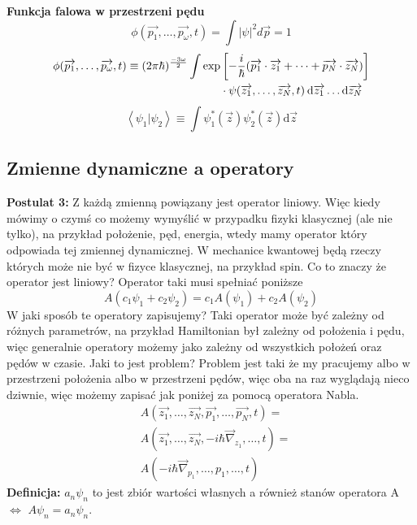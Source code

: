 \textbf{Funkcja falowa w przestrzeni pędu}
\begin{equation*}
	\phi (\overrightarrow{p_1}, \dots, \overrightarrow{p_{\omega}}, t) = \int |\psi|^2 d \overrightarrow{p} = 1
\end{equation*}
\begin{equation*}
	\begin{split}
		\phi (\overrightarrow{p_1}, \dots, \overrightarrow{p_{\omega}}, t) \equiv (2 \pi \hbar)^{\frac{-3\omega}{2}} \int \text{exp}&\left[ -\frac{i}{\hbar} (\overrightarrow{p_1} \cdot \overrightarrow{z_1} + \dots + \overrightarrow{p_N} \cdot \overrightarrow{z_N})  \right] \\
		&\cdot \vspace{10cm}\psi(\overrightarrow{z_1}, \dots, \overrightarrow{z_N}, t) \hspace{2pt} \text{d}\overrightarrow{z_1} \dots \text{d}\overrightarrow{z_N}
	\end{split}
\end{equation*}
\begin{equation*}
		\left< \psi_1 \vert \psi_2 \right> \equiv \int \psi_1^*(\overrightarrow{z}) \psi_2^*(\overrightarrow{z})\text{d}\overrightarrow{z}	
\end{equation*}
\subsection{Zmienne dynamiczne a operatory}
\textbf{Postulat 3:} Z każdą zmienną powiązany jest operator liniowy. 
Więc kiedy mówimy o czymś co możemy wymyślić w przypadku fizyki klasycznej (ale nie tylko), na przykład położenie, pęd, energia, wtedy mamy operator który odpowiada tej zmiennej dynamicznej. W mechanice kwantowej będą rzeczy których może nie być w fizyce klasycznej, na przykład spin. 
Co to znaczy że operator jest liniowy? Operator taki musi spełniać poniższe
\begin{equation*}
	A(c_1 \psi_1 + c_2 \psi_2) = c_1 A(\psi_1) + c_2 A(\psi_2)
\end{equation*}
W jaki sposób te operatory zapisujemy? Taki operator może być zależny od różnych parametrów, na przykład Hamiltonian był zależny od położenia i pędu, więc generalnie operatory możemy jako zależny od wszystkich położeń oraz pędów w czasie. Jaki to jest problem? Problem jest taki że my pracujemy albo w przestrzeni położenia albo w przestrzeni pędów, więc oba na raz wyglądają nieco dziwnie, więc możemy zapisać jak poniżej za pomocą operatora Nabla.
\begin{equation*}
	\begin{split}
		&A(\overrightarrow{z_1}, \dots, \overrightarrow{z_N}, \overrightarrow{p_1}, \dots, \overrightarrow{p_N}, t) = \\
		&A(\overrightarrow{z_1}, \dots, \overrightarrow{z_N}, -i \hbar \overrightarrow{\nabla}_{z_1}, \dots, t) = \\
		&A(-i \hbar \overrightarrow{\nabla}_{p_1}, \dots, p_1, \dots, t)
	\end{split}	
\end{equation*}
\textbf{Definicja:} ${a_n \psi_n}$ to jest zbiór wartości własnych a również stanów operatora A $\iff$ $A \psi_n = a_n \psi_n$.

